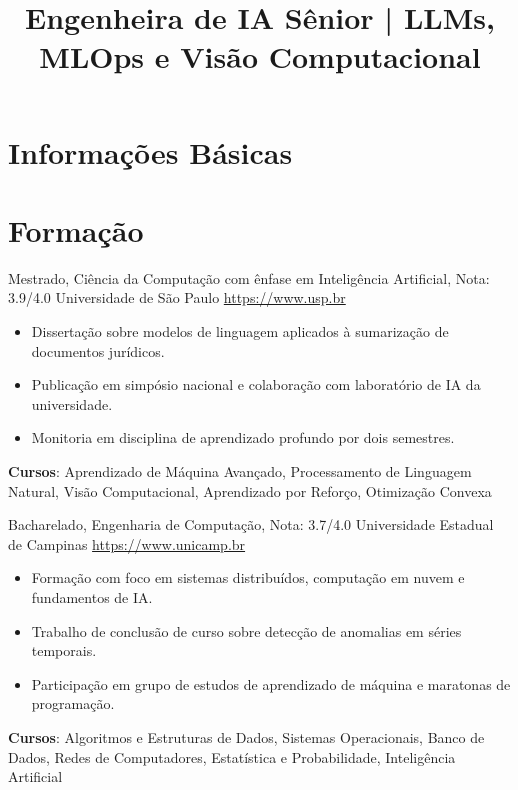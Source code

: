 \documentclass[a4paper, serif, 10pt]{moderncv}
\title{Engenheira de IA Sênior | LLMs, MLOps e Visão Computacional}
\begin{document}
\maketitle

\section{Informações Básicas}

\section{Formação}

        {Mestrado, Ciência da Computação com ênfase em Inteligência Artificial, Nota: 3.9/4.0}
        {Universidade de São Paulo}
        {\url{https://www.usp.br}}
        {}
        {\begin{itemize}
\item Dissertação sobre modelos de linguagem aplicados à sumarização de documentos jurídicos.
\item Publicação em simpósio nacional e colaboração com laboratório de IA da universidade.
\item Monitoria em disciplina de aprendizado profundo por dois semestres.
\end{itemize}
\textbf{Cursos}: Aprendizado de Máquina Avançado, Processamento de Linguagem Natural, Visão Computacional, Aprendizado por Reforço, Otimização Convexa}

        {Bacharelado, Engenharia de Computação, Nota: 3.7/4.0}
        {Universidade Estadual de Campinas}
        {\url{https://www.unicamp.br}}
        {}
        {\begin{itemize}
\item Formação com foco em sistemas distribuídos, computação em nuvem e fundamentos de IA.
\item Trabalho de conclusão de curso sobre detecção de anomalias em séries temporais.
\item Participação em grupo de estudos de aprendizado de máquina e maratonas de programação.
\end{itemize}
\textbf{Cursos}: Algoritmos e Estruturas de Dados, Sistemas Operacionais, Banco de Dados, Redes de Computadores, Estatística e Probabilidade, Inteligência Artificial}
\end{document}
